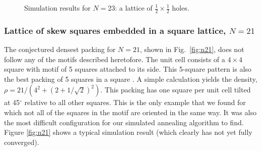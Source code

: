 \documentclass[preprint,aps]{revtex4}
\begin{document}
\begin{figure}[H]
\caption{\label{fig:n23}Simulation results for $N=23$: a lattice of $\frac{1}{2} \times \frac{1}{2}$ holes.}
\end{figure}




\subsubsection{Lattice of skew squares embedded in a square lattice, $N=21$}
The conjectured densest packing for  $N=21$, shown in Fig.\ \ref{fig:n21}, does not follow any of the motifs described heretofore. The unit cell consists of a $4 \times 4$ square with motif of 5 squares attached to its side.  This 5-square pattern is also the best packing of 5 squares in a square \cite{Friedman2002}.  A simple calculation yields the density, $\rho= 21/(4^2+(2+1/\sqrt{2})^2)$. This packing has one square per unit cell tilted at 45$^{\circ}$ relative to all other squares.  This is the only example that we found for which not all of the squares in the motif are oriented in the same way. It was also the most difficult configuration for our simulated annealing algorithm to find. Figure \ref{fig:n21} shows a typical simulation result (which clearly has not yet fully converged).
\end{document}
